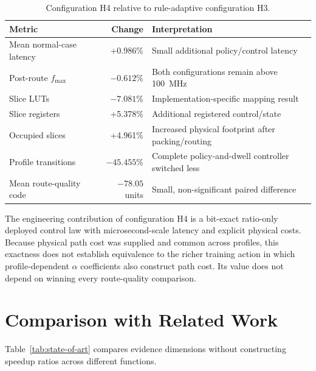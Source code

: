 \begin{table}[H]
\centering
\caption{Configuration H4 relative to rule-adaptive configuration H3.}
\label{tab:h4-h3-tradeoff}
\begin{tabularx}{\textwidth}{@{}X r X@{}}
\toprule
\textbf{Metric} & \textbf{Change} & \textbf{Interpretation}\\
\midrule
Mean normal-case latency & +0.986\% & Small additional policy/control latency\\
Post-route $f_{\max}$ & $-0.612$\% & Both configurations remain above 100~MHz\\
Slice LUTs & $-7.081$\% & Implementation-specific mapping result\\
Slice registers & +5.378\% & Additional registered control/state\\
Occupied slices & +4.961\% & Increased physical footprint after packing/routing\\
Profile transitions & $-45.455$\% & Complete policy-and-dwell controller switched less\\
Mean route-quality code & $-78.05$ units & Small, non-significant paired difference\\
\bottomrule
\end{tabularx}
\end{table}

The engineering contribution of configuration H4 is a bit-exact ratio-only deployed
control law with microsecond-scale latency and explicit physical costs. Because
physical path cost was supplied and common across profiles, this exactness does not
establish equivalence to the richer training action in which profile-dependent
$\alpha$ coefficients also construct path cost. Its value does not depend on winning
every route-quality comparison.

\section{Comparison with Related Work}

Table~\ref{tab:state-of-art} compares evidence dimensions without constructing
speedup ratios across different functions.


